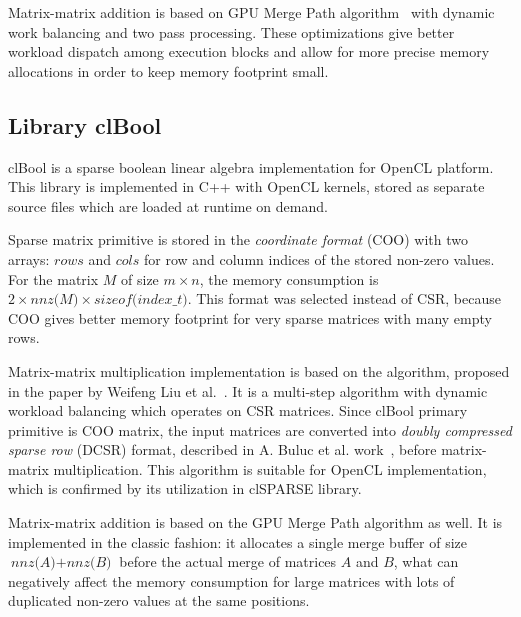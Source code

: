 Matrix-matrix addition is based on GPU Merge Path algorithm~\cite{inproceedings:gpu_merge_path} with dynamic work balancing and two pass processing.
These optimizations give better workload dispatch among execution blocks and allow for more precise memory allocations in order to keep memory footprint small.


\subsection{Library clBool}

clBool is a sparse boolean linear algebra implementation for OpenCL platform.
This library is implemented in C++ with OpenCL kernels, stored as separate source files which are loaded at runtime on demand.

Sparse matrix primitive is stored in the \textit{coordinate format} (COO) with two arrays: $rows$ and $cols$ for row and column indices of the stored non-zero values.
For the matrix $M$ of size $m \times n$, the memory consumption is $2 \times \textit{nnz(M)} \times \textit{sizeof(index\_t)}$.
This format was selected instead of CSR, because COO gives better memory footprint for very sparse matrices with many empty rows.

Matrix-matrix multiplication implementation is based on the algorithm, proposed in the paper by Weifeng Liu et al.~\cite{DBLP:journals/corr/0002V15a:spframework}.
It is a multi-step algorithm with dynamic workload balancing which operates on CSR matrices.
Since clBool primary primitive is COO matrix, the input matrices are converted into \textit{doubly compressed sparse row} (DCSR) format, described in A. Buluc et al. work~\cite{4536313:about:dcsr}, before matrix-matrix multiplication.
This algorithm is suitable for OpenCL implementation, which is confirmed by its utilization in clSPARSE library.

Matrix-matrix addition is based on the GPU Merge Path algorithm as well.
It is implemented in the classic fashion: it allocates a single merge buffer of size $\textit{nnz(A)} + \textit{nnz(B)}$ before the actual merge of matrices $A$ and $B$, what can negatively affect the memory consumption for large matrices with lots of duplicated non-zero values at the same positions.

